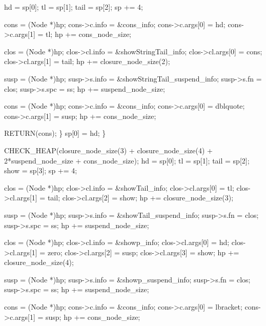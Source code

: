                 hd   = sp[0];
                tl   = sp[1];
                tail = sp[2];
                sp  += 4;

                cons = (Node *)hp;
                cons->c.info = &cons_info;
                cons->c.args[0] = hd;
                cons->c.args[1] = tl;
                hp             += cons_node_size;

                clos             = (Node *)hp;
                clos->cl.info    = &showStringTail_info;
                clos->cl.args[0] = cons;
                clos->cl.args[1] = tail;
                hp              += closure_node_size(2);

                susp         = (Node *)hp;
                susp->s.info = &showStringTail_suspend_info;
                susp->s.fn   = clos;
                susp->s.spc  = ss;
                hp          += suspend_node_size;

                cons            = (Node *)hp;
                cons->c.info    = &cons_info;
                cons->c.args[0] = dblquote;
                cons->c.args[1] = susp;
                hp             += cons_node_size;

                RETURN(cons);
            \}
        sp[0] = hd;
    \}

    CHECK_HEAP(closure_node_size(3) + closure_node_size(4)
               + 2*suspend_node_size + cons_node_size);
    hd   = sp[0];
    tl   = sp[1];
    tail = sp[2];
    show = sp[3];
    sp  += 4;

    clos             = (Node *)hp;
    clos->cl.info    = &showTail_info;
    clos->cl.args[0] = tl;
    clos->cl.args[1] = tail;
    clos->cl.args[2] = show;
    hp              += closure_node_size(3);

    susp         = (Node *)hp;
    susp->s.info = &showTail_suspend_info;
    susp->s.fn   = clos;
    susp->s.spc  = ss;
    hp          += suspend_node_size;

    clos             = (Node *)hp;
    clos->cl.info    = &showp_info;
    clos->cl.args[0] = hd;
    clos->cl.args[1] = zero;
    clos->cl.args[2] = susp;
    clos->cl.args[3] = show;
    hp              += closure_node_size(4);

    susp         = (Node *)hp;
    susp->s.info = &showp_suspend_info;
    susp->s.fn   = clos;
    susp->s.spc  = ss;
    hp          += suspend_node_size;

    cons            = (Node *)hp;
    cons->c.info    = &cons_info;
    cons->c.args[0] = lbracket;
    cons->c.args[1] = susp;
    hp             += cons_node_size;

